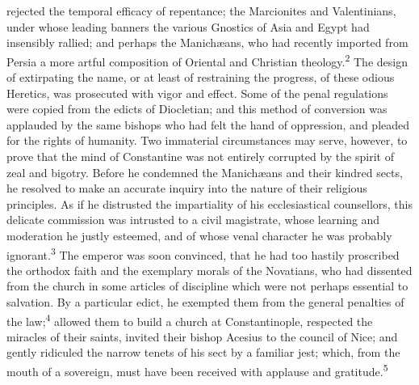 rejected the temporal efficacy of repentance; the Marcionites and
Valentinians, under whose leading banners the various Gnostics of
Asia and Egypt had insensibly rallied; and perhaps the
Manichæans, who had recently imported from Persia a more artful
composition of Oriental and Christian theology.\textsuperscript{2} The design of
extirpating the name, or at least of restraining the progress, of
these odious Heretics, was prosecuted with vigor and effect. Some
of the penal regulations were copied from the edicts of
Diocletian; and this method of conversion was applauded by the
same bishops who had felt the hand of oppression, and pleaded for
the rights of humanity. Two immaterial circumstances may serve,
however, to prove that the mind of Constantine was not entirely
corrupted by the spirit of zeal and bigotry. Before he condemned
the Manichæans and their kindred sects, he resolved to make an
accurate inquiry into the nature of their religious principles.
As if he distrusted the impartiality of his ecclesiastical
counsellors, this delicate commission was intrusted to a civil
magistrate, whose learning and moderation he justly esteemed, and
of whose venal character he was probably ignorant.\textsuperscript{3} The emperor
was soon convinced, that he had too hastily proscribed the
orthodox faith and the exemplary morals of the Novatians, who had
dissented from the church in some articles of discipline which
were not perhaps essential to salvation. By a particular edict,
he exempted them from the general penalties of the law;\textsuperscript{4} allowed
them to build a church at Constantinople, respected the miracles
of their saints, invited their bishop Acesius to the council of
Nice; and gently ridiculed the narrow tenets of his sect by a
familiar jest; which, from the mouth of a sovereign, must have
been received with applause and gratitude.\textsuperscript{5}




